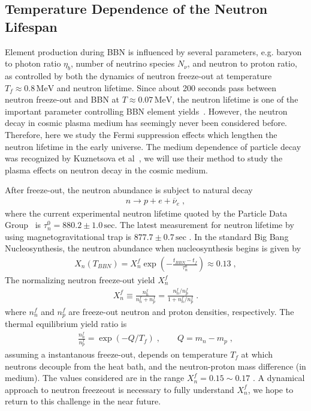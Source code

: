 
\subsection{Temperature Dependence of the Neutron Lifespan}

Element production during BBN is influenced by several parameters, e.g. baryon to photon ratio $\eta_b$, number of neutrino species $N_\nu$, and neutron to proton ratio, as controlled by both the dynamics of neutron freeze-out at temperature $T_f\approx 0.8\,\mathrm{MeV}$ and neutron lifetime. Since about 200 seconds pass between neutron freeze-out and BBN at $T\approx0.07\,\mathrm{MeV}$, the neutron lifetime is one of the important parameter controlling BBN element yields~\cite{Pitrou:2018cgg}. However, the neutron decay in cosmic plasma medium has seemingly never been considered before. Therefore, here we study the Fermi suppression effects which lengthen the neutron lifetime in the early universe. The medium dependence of particle decay was recognized by Kuznetsova et al~\cite{Kuznetsova:2010pi}, we will use their method to study the plasma effects on neutron decay in the cosmic medium.

After freeze-out, the neutron abundance is subject to natural decay
\begin{align}\label{Ndec}
n\longrightarrow p+e+\overline{\nu}_e\;,
\end{align}
where the current experimental neutron lifetime quoted by the Particle Data Group~\cite{ParticleDataGroup:2016lqr} is $\tau_n^0=880.2\pm1.0\,\mathrm{sec}$. The latest measurement for neutron lifetime by using magnetogravitational trap is $877.7\pm0.7\,\mathrm{sec}$ \cite{Pattie:2017vsj}. In the standard Big Bang Nucleosynthesis, the neutron abundance when nucleosynthesis begins is given by~\cite{Pitrou:2018cgg}
\begin{align}
\label{Xn_abundance}
X_n(T_{BBN})=X_n^f\exp\left(-\frac{t_{BBN}-t_f}{\tau_n^0}\right)\approx0.13\;,
\end{align}
The normalizing neutron freeze-out yield $X_n^f$ 
\begin{align}
\label{Xn_abundance2}
X_n^f \equiv  \frac{n_n^f}{n_n^f+n_p^f}= \frac{n_n^f/n_p^f}{1+n_n^f/n_p^f}\;.
\end{align}
where $n_n^f$ and $n_p^f$ are freeze-out neutron and proton densities, respectively. The thermal equilibrium yield ratio is
\begin{align}
\label{Xn_abundance3}
 \frac{n_n^f}{n_p^f}= \exp\left(-Q/T_f\right)\;,\qquad Q=m_n-m_p\;,
\end{align}
assuming a instantanous freeze-out, depends on temperature $T_f$ at which neutrons decouple from the heat bath, and the neutron-proton mass difference (in medium). The values considered  are in the range $X_n^f=0.15\sim0.17$ \cite{Pitrou:2018cgg}. A dynamical approach to neutron freezeout is necessary to fully understand $X_n^f$, we hope to return to this challenge in the near  future.

